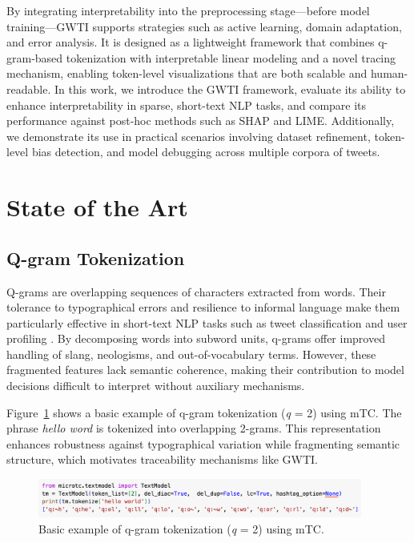 \documentclass[runningheads,10pt]{llncs}
\begin{document}
By integrating interpretability into the preprocessing stage—before model training—\ac{GWTI} supports strategies such as active learning, domain adaptation, and error analysis. It is designed as a lightweight framework that combines q-gram-based tokenization with interpretable linear modeling and a novel tracing mechanism, enabling token-level visualizations that are both scalable and human-readable. In this work, we introduce the \ac{GWTI} framework, evaluate its ability to enhance interpretability in sparse, short-text \ac{NLP} tasks, and compare its performance against post-hoc methods such as \ac{SHAP} and \ac{LIME}. Additionally, we demonstrate its use in practical scenarios involving dataset refinement, token-level bias detection, and model debugging across multiple corpora of tweets.

\section{State of the Art}
\label{sec/state-of-the-art}

\subsection{Q-gram Tokenization}
Q-grams are overlapping sequences of characters extracted from words. Their tolerance to typographical errors and resilience to informal language make them particularly effective in short-text \ac{NLP} tasks such as tweet classification and user profiling \cite{tellez2017case,hacohen2020influence}. By decomposing words into subword units, q-grams offer improved handling of slang, neologisms, and out-of-vocabulary terms. However, these fragmented features lack semantic coherence, making their contribution to model decisions difficult to interpret without auxiliary mechanisms.

Figure~\ref{fig:q_gram_tokenization} shows a basic example of q-gram tokenization (\textit{q} = 2) using \ac{mTC}. The phrase \textit{hello word} is tokenized into overlapping 2-grams. This representation enhances robustness against typographical variation while fragmenting semantic structure, which motivates traceability mechanisms like \ac{GWTI}.

\begin{figure}[h]
  \centering
  \includegraphics[width=0.95\textwidth]{q-gram_tokenization.png}
  \caption{Basic example of q-gram tokenization (\textit{q} = 2) using \ac{mTC}.}
  \label{fig:q_gram_tokenization}
\end{figure}
\end{document}
